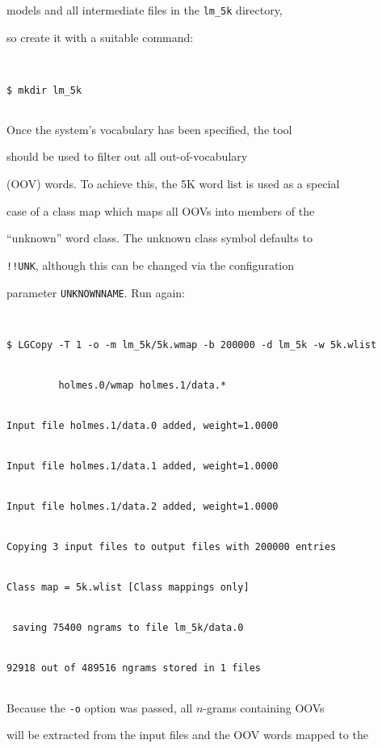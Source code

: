 models and all intermediate files in the \texttt{lm\_5k} directory,


so create it with a suitable command:


\begin{verbatim}


$ mkdir lm_5k


\end{verbatim} %





Once the system's vocabulary has been specified, the tool


 should be used to filter out all out-of-vocabulary


(OOV) words.  To achieve this, the 5K word list is used as a special


case of a class map which maps all OOVs into members of the


``unknown'' word class.  The unknown class symbol defaults to


\texttt{!!UNK}, although this can be changed via the configuration


parameter \texttt{UNKNOWNNAME}.  Run  again:





\begin{verbatim}


$ LGCopy -T 1 -o -m lm_5k/5k.wmap -b 200000 -d lm_5k -w 5k.wlist 


         holmes.0/wmap holmes.1/data.*


Input file holmes.1/data.0 added, weight=1.0000


Input file holmes.1/data.1 added, weight=1.0000


Input file holmes.1/data.2 added, weight=1.0000


Copying 3 input files to output files with 200000 entries


Class map = 5k.wlist [Class mappings only]


 saving 75400 ngrams to file lm_5k/data.0


92918 out of 489516 ngrams stored in 1 files


\end{verbatim} %





Because the {\tt -o} option was passed, all $n$-grams containing OOVs


will be extracted from the input files and the OOV words mapped to the


